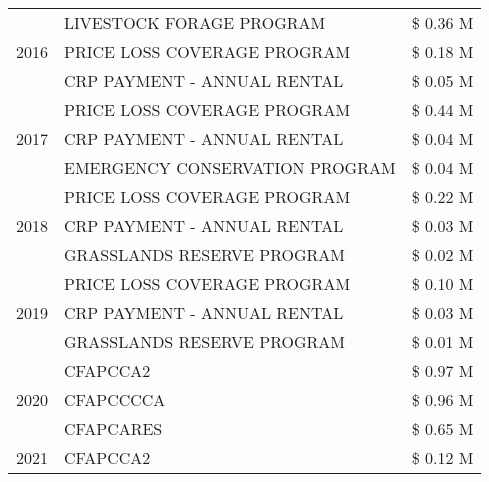 \begin{tabular}{llr}
\cline{1-3}
\multirow[t]{3}{*}{2016} & LIVESTOCK FORAGE PROGRAM & \$ 0.36 M \\
 & PRICE LOSS COVERAGE PROGRAM & \$ 0.18 M \\
 & CRP PAYMENT - ANNUAL RENTAL & \$ 0.05 M \\
\cline{1-3}
\multirow[t]{3}{*}{2017} & PRICE LOSS COVERAGE PROGRAM & \$ 0.44 M \\
 & CRP PAYMENT - ANNUAL RENTAL & \$ 0.04 M \\
 & EMERGENCY CONSERVATION PROGRAM & \$ 0.04 M \\
\cline{1-3}
\multirow[t]{3}{*}{2018} & PRICE LOSS COVERAGE PROGRAM & \$ 0.22 M \\
 & CRP PAYMENT - ANNUAL RENTAL & \$ 0.03 M \\
 & GRASSLANDS RESERVE PROGRAM & \$ 0.02 M \\
\cline{1-3}
\multirow[t]{3}{*}{2019} & PRICE LOSS COVERAGE PROGRAM & \$ 0.10 M \\
 & CRP PAYMENT - ANNUAL RENTAL & \$ 0.03 M \\
 & GRASSLANDS RESERVE PROGRAM & \$ 0.01 M \\
\cline{1-3}
\multirow[t]{3}{*}{2020} & CFAPCCA2 & \$ 0.97 M \\
 & CFAPCCCCA & \$ 0.96 M \\
 & CFAPCARES & \$ 0.65 M \\
\cline{1-3}
2021 & CFAPCCA2 & \$ 0.12 M \\
\cline{1-3}
\bottomrule
\end{tabular}
